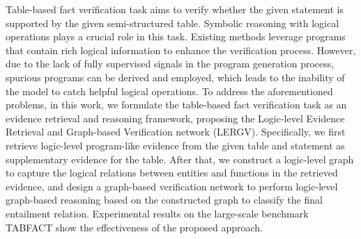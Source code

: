 Table-based fact verification task aims to verify whether the given statement is supported by the given semi-structured table. Symbolic reasoning with logical operations plays a crucial role in this task. Existing methods leverage programs that contain rich logical information to enhance the verification process. However, due to the lack of fully supervised signals in the program generation process, spurious programs can be derived and employed, which leads to the inability of the model to catch helpful logical operations. To address the aforementioned problems, in this work, we formulate the table-based fact verification task as an evidence retrieval and reasoning framework, proposing the Logic-level Evidence Retrieval and Graph-based Verification network (LERGV). Specifically, we first retrieve logic-level program-like evidence from the given table and statement as supplementary evidence for the table. After that, we construct a logic-level graph to capture the logical relations between entities and functions in the retrieved evidence, and design a graph-based verification network to perform logic-level graph-based reasoning based on the constructed graph to classify the final entailment relation. Experimental results on the large-scale benchmark TABFACT show the effectiveness of the proposed approach.
